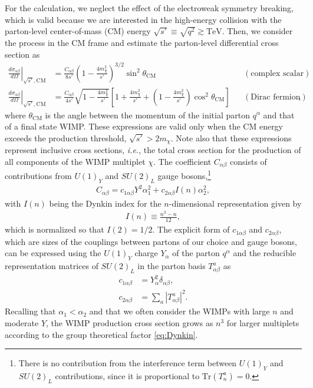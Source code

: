 \documentclass[12pt,twoside,book]{article}
\begin{document}
For the calculation, we neglect the effect of the electroweak symmetry breaking, which is valid because we are interested in the high-energy collision with the parton-level center-of-mass (CM) energy $\sqrt{s'} \equiv \sqrt{q^2} \gtrsim \mathrm{TeV}$.
Then, we consider the process in the CM frame and estimate the parton-level differential cross section as
\begin{align}
  \left. \frac{d \sigma_{\alpha \beta}}{d \Omega} \right|_{\sqrt{s'}, \text{CM}}
  &= \frac{C_{\alpha \beta}}{8 s'} \left( 1 - \frac{4 m_\chi^2}{s'} \right)^{3/2} \sin^2 \theta_{\mathrm{CM}}
  & &(\text{complex scalar}) \label{eq:parton_cross_section_scalar} \\
  \left. \frac{d \sigma_{\alpha \beta}}{d \Omega} \right|_{\sqrt{s'}, \text{CM}}
  &= \frac{C_{\alpha \beta}}{4 s'} \sqrt{1 - \frac{4 m_\chi^2}{s'}}
  \left[ 1 + \frac{4 m_\chi^2}{s'} + \left( 1 - \frac{4 m_\chi^2}{s'} \right) \cos^2 \theta_{\mathrm{CM}} \right]
  & &(\text{Dirac fermion}), \label{eq:parton_cross_section_fermion}
\end{align}
where $\theta_{\mathrm{CM}}$ is the angle between the momentum of the initial parton $q^\alpha$ and that of a final state WIMP.
These expressions are valid only when the CM energy exceeds the production threshold, $\sqrt{s'} > 2m_\chi$.
Note also that these expressions represent inclusive cross sections, \textit{i.e.}, the total cross section for the production of all components of the WIMP multiplet $\chi$.
The coefficient $C_{\alpha \beta}$ consists of contributions from $U(1)_Y$ and $SU(2)_L$ gauge bosons,\footnote
{
  There is no contribution from the interference term between $U(1)_Y$ and $SU(2)_L$ contributions, since it is proportional to $\mathrm{Tr} (T^a_n) = 0$.
}
\begin{align}
  C_{\alpha \beta} = c_{1 \alpha \beta} Y^2 \alpha_1^2
  + c_{2 \alpha \beta} I(n) \alpha_2^2,
\end{align}
with $I(n)$ being the Dynkin index for the $n$-dimensional representation given by
\begin{align}
  I(n) \equiv \frac{n^3-n}{12},
  \label{eq:Dynkin}
\end{align}
which is normalized so that $I(2) = 1/2$.
The explicit form of $c_{1 \alpha \beta}$ and $c_{2 \alpha \beta}$, which are sizes of the couplings between partons of our choice and gauge bosons, can be expressed using the $U(1)_Y$ charge $Y_\alpha$ of the parton $q^\alpha$ and the reducible representation matrices of $SU(2)_L$ in the parton basis $T^a_{\alpha \beta}$ as
\begin{align}
  c_{1 \alpha \beta} &= Y_\alpha^2 \delta_{\alpha \beta},\\
  c_{2 \alpha \beta} &= \sum_a \left| T^a_{\alpha \beta} \right|^2.
\end{align}
Recalling that $\alpha_1 < \alpha_2$ and that we often consider the WIMPs with large $n$ and moderate $Y$, the WIMP production cross section grows as $n^3$ for larger multiplets according to the group theoretical factor \eqref{eq:Dynkin}.
\end{document}
